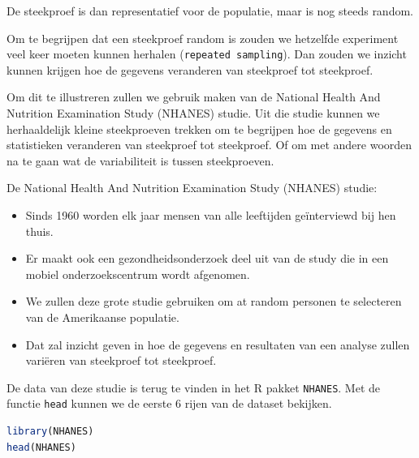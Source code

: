 \documentclass[
  12pt,dutch,coursenotes]{book}
\newcommand{\passthrough}[1]{#1}
\theoremstyle{definition}
\theoremstyle{definition}
\theoremstyle{definition}
\theoremstyle{definition}
\theoremstyle{remark}
\begin{document}
De steekproef is dan representatief voor de populatie, maar is nog steeds random.

Om te begrijpen dat een steekproef random is zouden we hetzelfde experiment veel keer moeten kunnen herhalen (\passthrough{\lstinline!repeated sampling!}). Dan zouden we inzicht kunnen krijgen hoe de gegevens veranderen van steekproef tot steekproef.

Om dit te illustreren zullen we gebruik maken van de National Health And Nutrition Examination Study (NHANES) studie. Uit die studie kunnen we herhaaldelijk kleine steekproeven trekken om te begrijpen hoe de gegevens en statistieken veranderen van steekproef tot steekproef. Of om met andere woorden na te gaan wat de variabiliteit is tussen steekproeven.

De National Health And Nutrition Examination Study (NHANES) studie:

\begin{itemize}
\item
  Sinds 1960 worden elk jaar mensen van alle leeftijden geïnterviewd bij hen thuis.
\item
  Er maakt ook een gezondheidsonderzoek deel uit van de study die in een mobiel onderzoekscentrum wordt afgenomen.
\item
  We zullen deze grote studie gebruiken om at random personen te selecteren van de Amerikaanse populatie.
\item
  Dat zal inzicht geven in hoe de gegevens en resultaten van een analyse zullen variëren van steekproef tot steekproef.
\end{itemize}

De data van deze studie is terug te vinden in het R pakket \passthrough{\lstinline!NHANES!}. Met de functie \passthrough{\lstinline!head!} kunnen we de eerste 6 rijen van de dataset bekijken.

\begin{lstlisting}[language=R]
library(NHANES)
head(NHANES)
\end{lstlisting}
\end{document}
